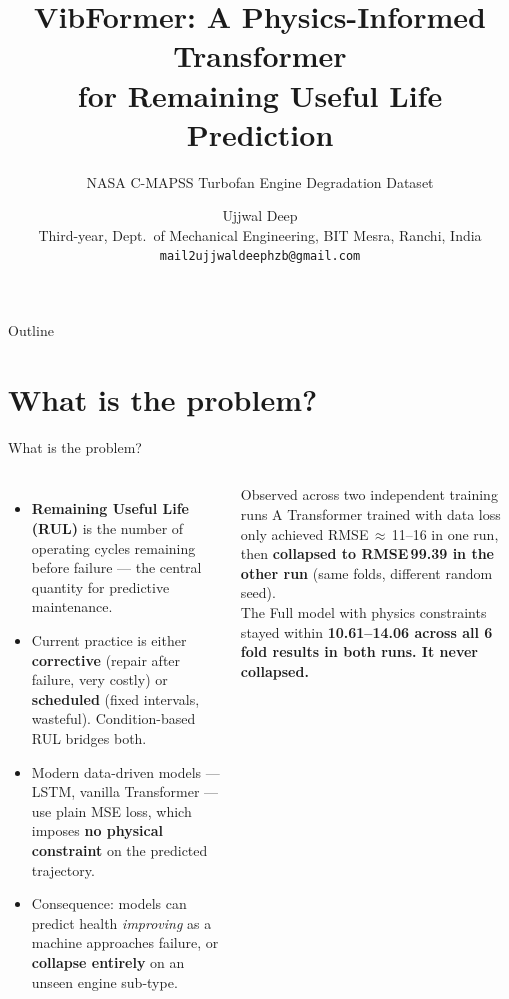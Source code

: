 \documentclass[10pt, aspectratio=169, handout]{beamer}
\title{VibFormer: A Physics-Informed Transformer\\
       for Remaining Useful Life Prediction}
\subtitle{NASA C-MAPSS Turbofan Engine Degradation Dataset}
\author{Ujjwal Deep\\
        {\small Third-year, Dept.\ of Mechanical Engineering,
                BIT Mesra, Ranchi, India}\\
        {\footnotesize \texttt{mail2ujjwaldeephzb@gmail.com}}}
\institute{}
\date{}
\begin{document}

\maketitle

\begin{frame}{Outline}
  \tableofcontents
\end{frame}

\section{What is the problem?}

\begin{frame}{What is the problem?}
  \begin{columns}[T]
      \begin{itemize}
        \setlength\itemsep{9pt}
        \item<1-> \textbf{Remaining Useful Life (RUL)} is the number of operating cycles
              remaining before failure --- the central quantity for predictive maintenance.
        \item<2-> Current practice is either \textbf{corrective} (repair after failure, very
              costly) or \textbf{scheduled} (fixed intervals, wasteful).
              Condition-based RUL bridges both.
        \item<3-> Modern data-driven models --- LSTM, vanilla Transformer --- use plain MSE
              loss, which imposes \textbf{no physical constraint} on the predicted trajectory.
        \item<4-> Consequence: models can predict health \emph{improving} as a machine
              approaches failure, or \textbf{collapse entirely} on an unseen engine sub-type.
      \end{itemize}
      \begin{alertblock}{Observed across two independent training runs}
      \small
      A Transformer trained with data loss only achieved RMSE\,$\approx$\,11--16
      in one run, then \textbf{collapsed to RMSE\,99.39 in the other run}
      (same folds, different random seed).\\[6pt]
      The Full model with physics constraints stayed within
      \textbf{10.61--14.06 across all 6 fold results in both runs.
      It never collapsed.}
    \end{alertblock}
  \end{columns}
\end{frame}
\end{document}
